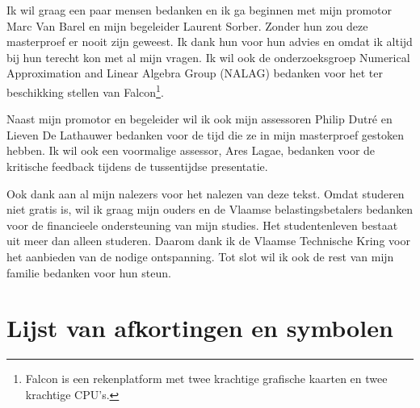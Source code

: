 \documentclass[master=cws ,masteroption=gs]{kulemt}
\begin{document}
\begin{preface}
	Ik wil graag een paar mensen bedanken en ik ga beginnen met mijn promotor Marc Van Barel en mijn begeleider Laurent Sorber. Zonder hun zou deze masterproef er nooit zijn geweest. Ik dank hun voor hun advies en omdat ik altijd bij hun terecht kon met al mijn vragen. Ik wil ook de onderzoeksgroep Numerical Approximation and Linear Algebra Group (NALAG) bedanken voor het ter beschikking stellen van Falcon\footnote{Falcon is een rekenplatform met twee krachtige grafische kaarten en twee krachtige CPU's.}.
	
	Naast mijn promotor en begeleider wil ik ook mijn assessoren Philip Dutr\'e en Lieven De Lathauwer bedanken voor de tijd die ze in mijn masterproef gestoken hebben. Ik wil ook een voormalige assessor, Ares Lagae, bedanken voor de kritische feedback tijdens de tussentijdse presentatie.

	Ook dank aan al mijn nalezers voor het nalezen van deze tekst.
	Omdat studeren niet gratis is, wil ik graag mijn ouders en de Vlaamse belastingsbetalers bedanken voor de financieele ondersteuning van mijn studies.
	Het studentenleven bestaat uit meer dan alleen studeren. Daarom dank ik de Vlaamse Technische Kring voor het aanbieden van de nodige ontspanning.
	Tot slot wil ik ook de rest van mijn familie bedanken voor hun steun.
\end{preface}

\tableofcontents*

\begin{abstract}
  In dit \texttt{abstract} environment wordt een al dan niet uitgebreide
  samenvatting van het werk gegeven. De bedoeling is wel dat dit tot
  1~bladzijde beperkt blijft.

  \lipsum[1]
\end{abstract}

\listoffiguresandtables
\chapter{Lijst van afkortingen en symbolen}
\end{document}
